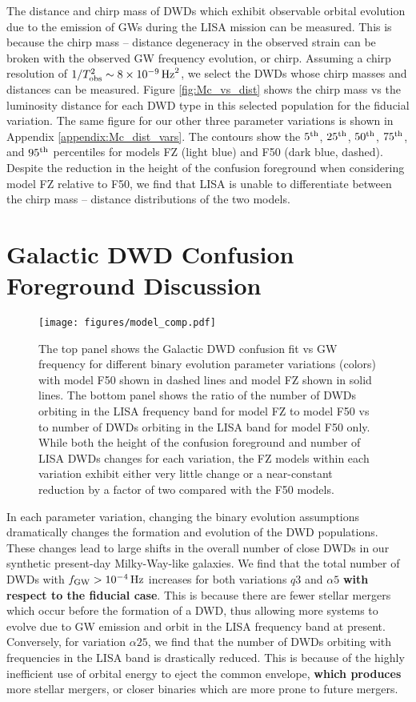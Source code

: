 \documentclass[twocolumn, linenumbers]{aastex631}
\begin{document}
The distance and chirp mass of DWDs which exhibit observable orbital evolution due to the emission of GWs during the LISA mission can be measured. This is because the chirp mass -- distance degeneracy in the observed strain can be broken with the observed GW frequency evolution, or chirp. Assuming a chirp resolution of $1/T_{\rm{obs}}^2 \sim 8\times10^{-9}\,\rm{Hz}^2$, we select the DWDs whose chirp masses and distances can be measured. Figure \ref{fig:Mc_vs_dist} shows the chirp mass vs the luminosity distance for each DWD type in this selected population for the fiducial variation. The same figure for our other three parameter variations is shown in Appendix \ref{appendix:Mc_dist_vars}. The contours show the $5^{\rm{th}}$, $25^{\rm{th}}$, $50^{\rm{th}}$, $75^{\rm{th}}$, and $95^{\rm{th}}$ percentiles for models FZ (light blue) and F50 (dark blue, dashed). Despite the reduction in the height of the confusion foreground when considering model FZ relative to F50, we find that LISA is unable to differentiate between the chirp mass -- distance distributions of the two models. 

\section{Galactic DWD Confusion Foreground Discussion}
\label{sec:model_compare}


\begin{figure}
	\texttt{[image: figures/model\_comp.pdf]}
    \caption{The top panel shows the Galactic DWD confusion fit vs GW frequency for different binary evolution parameter variations (colors) with model F50 shown in dashed lines and model FZ shown in solid lines. The bottom panel shows the ratio of the number of DWDs orbiting in the LISA frequency band for model FZ to model F50 vs to number of DWDs orbiting in the LISA band for model F50 only. While both the height of the confusion foreground and number of LISA DWDs changes for each variation, the FZ models within each variation exhibit either very little change or a  near-constant reduction by a factor of two compared with the F50 models.}
    \label{fig:model_comp}
\end{figure}

In each parameter variation, changing the binary evolution assumptions dramatically changes the formation and evolution of the DWD populations. These changes lead to large shifts in the overall number of close DWDs in our synthetic present-day Milky-Way-like galaxies. We find that the total number of DWDs with $f_{\rm{GW}}>10^{-4}\,\rm{Hz}$ increases for both variations $q3$ and $\alpha5$ \textbf{with respect to the fiducial case}. This is because there are fewer stellar mergers which occur before the formation of a DWD, thus allowing more systems to evolve due to GW emission and orbit in the LISA frequency band at present. Conversely, for variation $\alpha25$, we find that the number of DWDs orbiting with frequencies in the LISA band is drastically reduced. This is because of the highly inefficient use of orbital energy to eject the common envelope, \textbf{which produces} more stellar mergers, or closer binaries which are more prone to future mergers.
\end{document}
